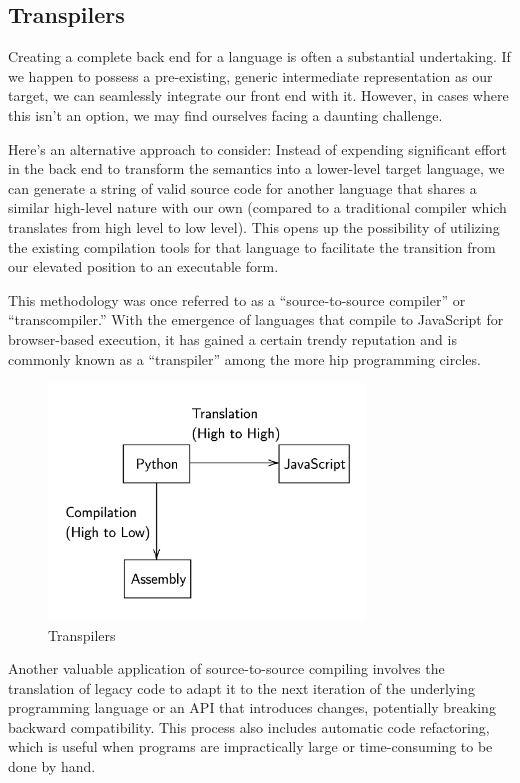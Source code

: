 {\subsection{Transpilers}

Creating a complete back end for a language is often a substantial undertaking. If we happen to possess a pre-existing, generic intermediate representation as our target, we can seamlessly integrate our front end with it. However, in cases where this isn't an option, we may find ourselves facing a daunting challenge.

Here's an alternative approach to consider: Instead of expending significant effort in the back end to transform the semantics into a lower-level target language, we can generate a string of valid source code for another language that shares a similar high-level nature with our own (compared to a traditional compiler which translates from high level to low level). This opens up the possibility of utilizing the existing compilation tools for that language to facilitate the transition from our elevated position to an executable form.

This methodology was once referred to as a ``source-to-source compiler'' or ``transcompiler.'' With the emergence of languages that compile to JavaScript for browser-based execution, it has gained a certain trendy reputation and is commonly known as a ``transpiler'' among the more hip programming circles.

\begin{figure}[h]
\centering
\includegraphics[width=0.75\textwidth]{gfx/transpiler.png}
\caption{Transpilers}
\end{figure}

Another valuable application of source-to-source compiling involves the translation of legacy code to adapt it to the next iteration of the underlying programming language or an \ac{API} that introduces changes, potentially breaking backward compatibility. This process also includes automatic code refactoring, which is useful when programs are impractically large or time-consuming to be done by hand. 

}
